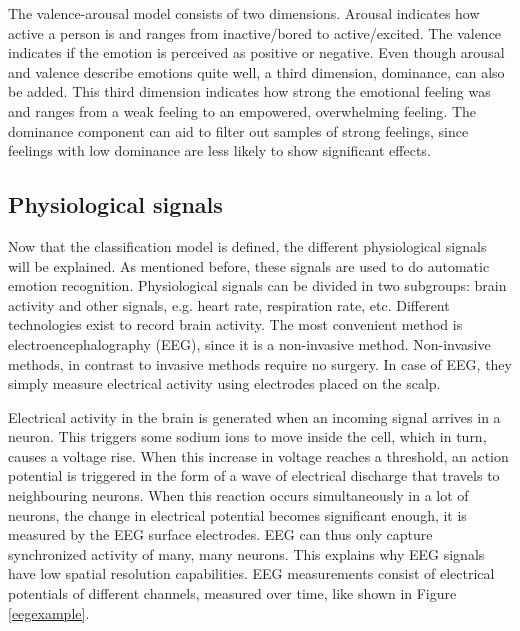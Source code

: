 \npar

The valence-arousal model consists of two dimensions. Arousal indicates how active a person is and ranges from inactive/bored to active/excited. The valence indicates if the emotion is perceived as positive or negative. Even though arousal and valence describe emotions quite well, a third dimension, dominance, can also be added. This third dimension indicates how strong the emotional feeling was and ranges from a weak feeling to an empowered, overwhelming feeling. The dominance component can aid to filter out samples of strong feelings, since feelings with low dominance are less likely to show significant effects.


\subsection{Physiological signals}

Now that the classification model is defined, the different physiological signals will be explained. As mentioned before, these signals are used to do automatic emotion recognition. Physiological signals can be divided in two subgroups: brain activity and other signals, e.g. heart rate, respiration rate, etc. Different technologies exist to record brain activity. The most convenient method is electroencephalography (EEG), since it is a non-invasive method. Non-invasive methods, in contrast to invasive methods require no surgery. In case of EEG, they simply measure electrical activity using electrodes placed on the scalp.

\npar

Electrical activity in the brain is generated when an incoming signal arrives in a neuron. This triggers some sodium ions to move inside the cell, which in turn, causes a voltage rise\cite{ExtendedPaper}. When this increase in voltage reaches a threshold, an action potential is triggered in the form of a wave of electrical discharge that travels to neighbouring neurons. When this reaction occurs simultaneously in a lot of neurons, the change in electrical potential becomes significant enough, it is measured by the EEG surface electrodes. EEG can thus only capture synchronized activity of many, many neurons\cite{ExtendedPaper}. This explains why EEG signals have low spatial resolution capabilities. EEG measurements consist of electrical potentials of different channels, measured over time, like shown in Figure \ref{eegexample}.


